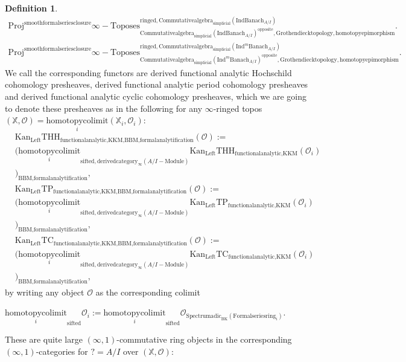\documentclass[11pt]{book}
\theoremstyle{definition}
\newtheorem{definition}[theorem]{Definition}
\numberwithin{equation}{section}
\begin{document}
\begin{definition}
\begin{align}
\mathrm{Proj}^\text{smoothformalseriesclosure}\infty-\mathrm{Toposes}^{\mathrm{ringed},\mathrm{Commutativealgebra}_{\mathrm{simplicial}}(\mathrm{Ind}\mathrm{Banach}_{A/I})}_{\mathrm{Commutativealgebra}_{\mathrm{simplicial}}(\mathrm{Ind}\mathrm{Banach}_{A/I})^\mathrm{opposite},\mathrm{Grothendiecktopology,homotopyepimorphism}}.\\
\mathrm{Proj}^\text{smoothformalseriesclosure}\infty-\mathrm{Toposes}^{\mathrm{ringed},\mathrm{Commutativealgebra}_{\mathrm{simplicial}}(\mathrm{Ind}^m\mathrm{Banach}_{A/I})}_{\mathrm{Commutativealgebra}_{\mathrm{simplicial}}(\mathrm{Ind}^m\mathrm{Banach}_{A/I})^\mathrm{opposite},\mathrm{Grothendiecktopology,homotopyepimorphism}}. 
\end{align}
We call the corresponding functors are derived functional analytic Hochschild cohomology presheaves, derived functional analytic period cohomology presheaves and derived functional analytic cyclic cohomology presheaves, which we are going to denote these presheaves as in the following for any $\infty$-ringed topos $(\mathbb{X},\mathcal{O})=\underset{i}{\text{homotopycolimit}}(\mathbb{X}_i,\mathcal{O}_i)$:
\begin{align}
	&\mathrm{Kan}_{\mathrm{Left}}\mathrm{THH}_{\text{functionalanalytic,KKM},\text{BBM,formalanalytification}}(\mathcal{O}):=\\
	&(\underset{i}{\text{homotopycolimit}}_{\text{sifted},\text{derivedcategory}_{\infty}(A/I-\text{Module})}\mathrm{Kan}_{\mathrm{Left}}\mathrm{THH}_{\text{functionalanalytic,KKM}}(\mathcal{O}_i)\\
	&)_\text{BBM,formalanalytification},\\
	&\mathrm{Kan}_{\mathrm{Left}}\mathrm{TP}_{\text{functionalanalytic,KKM},\text{BBM,formalanalytification}}(\mathcal{O}):=\\
	&(\underset{i}{\text{homotopycolimit}}_{\text{sifted},\text{derivedcategory}_{\infty}(A/I-\text{Module})}\mathrm{Kan}_{\mathrm{Left}}\mathrm{TP}_{\text{functionalanalytic,KKM}}(\mathcal{O}_i)\\
	&)_\text{BBM,formalanalytification},\\
	&\mathrm{Kan}_{\mathrm{Left}}\mathrm{TC}_{\text{functionalanalytic,KKM},\text{BBM,formalanalytification}}(\mathcal{O}):=\\
	&(\underset{i}{\text{homotopycolimit}}_{\text{sifted},\text{derivedcategory}_{\infty}(A/I-\text{Module})}\mathrm{Kan}_{\mathrm{Left}}\mathrm{TC}_{\text{functionalanalytic,KKM}}(\mathcal{O}_i)\\
	&)_\text{BBM,formalanalytification},
\end{align}
by writing any object $\mathcal{O}$ as the corresponding colimit 
\begin{center}
$\underset{i}{\text{homotopycolimit}}_\text{sifted}\mathcal{O}_i:=\underset{i}{\text{homotopycolimit}}_\text{sifted}\mathcal{O}_{\mathrm{Spectrumadic}_\mathrm{BK}(\mathrm{Formalseriesring}_i)}$.
\end{center}
These are quite large $(\infty,1)$-commutative ring objects in the corresponding $(\infty,1)$-categories for $?=A/I$ over $(\mathbb{X},\mathcal{O})$:


\end{definition}
\end{document}
